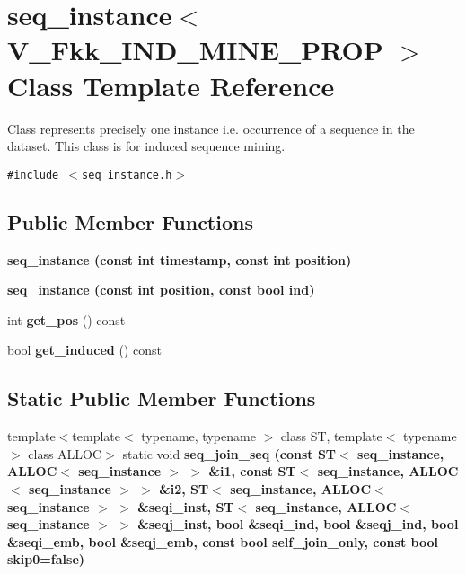 \section{seq\_\-instance$<$ V\_\-Fkk\_\-IND\_\-MINE\_\-PROP $>$ Class Template Reference}
\label{classseq__instance_3_01V__Fkk__IND__MINE__PROP_01_4}
Class represents precisely one instance i.e. occurrence of a sequence in the dataset. This class is for induced sequence mining.  


{\tt \#include $<$seq\_\-instance.h$>$}

\subsection*{Public Member Functions}
\begin{CompactItemize}
\item 
\bf{seq\_\-instance} (const int timestamp, const int position)
\item 
\bf{seq\_\-instance} (const int position, const bool ind)
\item 
int \textbf{get\_\-pos} () const \label{classseq__instance_3_01V__Fkk__IND__MINE__PROP_01_4_8b13d0ddf55f1f2058f3ca6d5d379054}

\item 
bool \textbf{get\_\-induced} () const \label{classseq__instance_3_01V__Fkk__IND__MINE__PROP_01_4_0c18eb4097f06dbcaa72df4b266b23c9}

\end{CompactItemize}
\subsection*{Static Public Member Functions}
\begin{CompactItemize}
\item 
template$<$template$<$ typename, typename $>$ class ST, template$<$ typename $>$ class ALLOC$>$ static void \bf{seq\_\-join\_\-seq} (const ST$<$ \bf{seq\_\-instance}, ALLOC$<$ \bf{seq\_\-instance} $>$ $>$ \&i1, const ST$<$ \bf{seq\_\-instance}, ALLOC$<$ \bf{seq\_\-instance} $>$ $>$ \&i2, ST$<$ \bf{seq\_\-instance}, ALLOC$<$ \bf{seq\_\-instance} $>$ $>$ \&seqi\_\-inst, ST$<$ \bf{seq\_\-instance}, ALLOC$<$ \bf{seq\_\-instance} $>$ $>$ \&seqj\_\-inst, bool \&seqi\_\-ind, bool \&seqj\_\-ind, bool \&seqi\_\-emb, bool \&seqj\_\-emb, const bool self\_\-join\_\-only, const bool skip0=false)
\end{CompactItemize}
